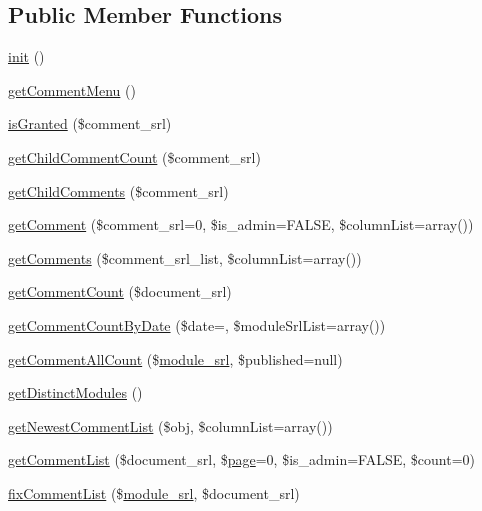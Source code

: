\subsection*{Public Member Functions}
\begin{DoxyCompactItemize}
\item 
\hyperlink{classcommentModel_a4da59f10ea425e61dbd5bebe73ab9ec1}{init} ()
\item 
\hyperlink{classcommentModel_a74e52809b658711e8d63ba7900eb5246}{get\+Comment\+Menu} ()
\item 
\hyperlink{classcommentModel_aff0bb9049c29d3795fbe2c7eb92a2451}{is\+Granted} (\$comment\+\_\+srl)
\item 
\hyperlink{classcommentModel_adfb890eecf72a039c9f7a28c1e6eb3d2}{get\+Child\+Comment\+Count} (\$comment\+\_\+srl)
\item 
\hyperlink{classcommentModel_ac1acb7d6d8da68e20ec5e6e5a55e5d32}{get\+Child\+Comments} (\$comment\+\_\+srl)
\item 
\hyperlink{classcommentModel_adc900f3123da26b591a20ca7a951e4ac}{get\+Comment} (\$comment\+\_\+srl=0, \$is\+\_\+admin=F\+A\+L\+SE, \$column\+List=array())
\item 
\hyperlink{classcommentModel_a435e77a0e774c5b6ba899312e8bea2dd}{get\+Comments} (\$comment\+\_\+srl\+\_\+list, \$column\+List=array())
\item 
\hyperlink{classcommentModel_af28e4e312fad244148fd96bd0e8f0b5f}{get\+Comment\+Count} (\$document\+\_\+srl)
\item 
\hyperlink{classcommentModel_ab79db8608e406abcdeedbcd3f8c97f0f}{get\+Comment\+Count\+By\+Date} (\$date=\textquotesingle{}\textquotesingle{}, \$module\+Srl\+List=array())
\item 
\hyperlink{classcommentModel_a6d868da113e98ecde6c6e5cb12ce4cbf}{get\+Comment\+All\+Count} (\$\hyperlink{ko_8install_8php_a370bb6450fab1da3e0ed9f484a38b761}{module\+\_\+srl}, \$published=null)
\item 
\hyperlink{classcommentModel_a4f202e4238ab75645a10db6acaa1f969}{get\+Distinct\+Modules} ()
\item 
\hyperlink{classcommentModel_a89492b8f475e42296e1560b8886bdc01}{get\+Newest\+Comment\+List} (\$obj, \$column\+List=array())
\item 
\hyperlink{classcommentModel_ae43f36bfd32d39f87dac358aa1526f7f}{get\+Comment\+List} (\$document\+\_\+srl, \$\hyperlink{classpage}{page}=0, \$is\+\_\+admin=F\+A\+L\+SE, \$count=0)
\item 
\hyperlink{classcommentModel_af9457d8f1128af78c79ea416d591fc13}{fix\+Comment\+List} (\$\hyperlink{ko_8install_8php_a370bb6450fab1da3e0ed9f484a38b761}{module\+\_\+srl}, \$document\+\_\+srl)

\end{DoxyCompactItemize}
